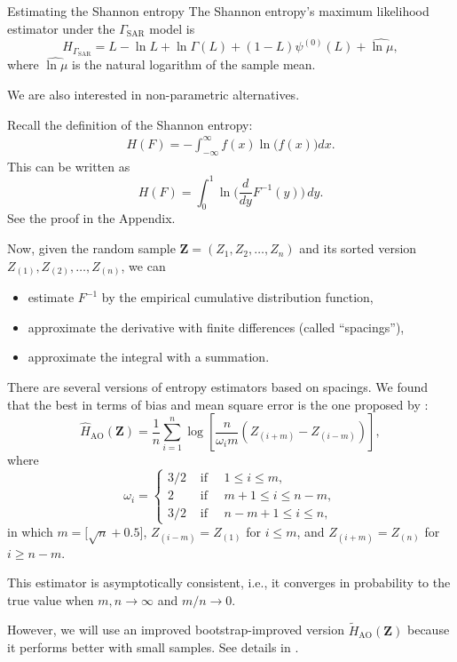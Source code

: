 \documentclass[table,aspectratio=169]{beamer}
\begin{document}
\begin{frame}[allowframebreaks]{Estimating the Shannon entropy}
The Shannon entropy's maximum likelihood estimator under the $\Gamma_{\text{SAR}}$ model is
$$
\widehat{H_{\Gamma_{\text{SAR}}}} = L -\ln L+\ln\Gamma(L)+(1-L)\psi^{(0)}(L) + \widehat{\ln \mu},
$$
where $\widehat{\ln \mu}$ is the natural logarithm of the sample mean.

We are also interested in non-parametric alternatives.

Recall the definition of the Shannon entropy:
\begin{align*}
	H(F) = -\int_{-\infty}^\infty f(x) \ln\big(f(x)\big) dx.
\end{align*}
This can be written as
$$
H(F) = \int_{0}^{1} \ln \Big( \frac{d}{dy} F^{-1}(y) \Big) \, dy.
$$
See the proof in the Appendix.

Now, given the random sample $\bm Z=(Z_1,Z_2,\dots,Z_n)$ and its sorted version $Z_{(1)},Z_{(2)},\dots,Z_{(n)}$, we can 
\begin{itemize}
	\item estimate $F^{-1}$ by the empirical cumulative distribution function,
	\item approximate the derivative with finite differences (called ``spacings''),
	\item approximate the integral with a summation.
\end{itemize}

There are several versions of entropy estimators based on spacings.
We found that the best in terms of bias and mean square error is the one proposed by
\citet{IbrahimAlOmari2014}:
 \[
	\widehat{H}_{\text{AO}}(\bm{Z})=\frac{1}{n} \sum_{i=1}^n \log \left[\frac{n}{\omega_i m}\left(Z_{(i+m)}-Z_{(i-m)}\right)\right],
	\] where \[
	\omega_i= \begin{cases}3/2 & \text { if }\quad 1 \leq i \leq m, \\ 2 & \text { if }\quad m+1 \leq i \leq n-m, \\ 3/2 & \text { if } \quad n-m+1 \leq i \leq n,\end{cases}
	\] 
	in which \(m=\big[\sqrt{n}+0.5\big]\), \(Z_{(i-m)}=Z_{(1)}\) for \(i \leq m\), and
	\(Z_{(i+m)}=Z_{(n)}\) for \(i \geq n-m\).

This estimator is asymptotically consistent, i.e., it converges in
probability to the true value when \(m,n\rightarrow\infty\) and
\(m/n\rightarrow0\). 

However, we will use an improved bootstrap-improved
version $\widetilde{H}_{\text{AO}}(\bm Z)$ because it performs better with small samples.
See details in \citet{IdentifyingHeterogeneityinSARDatawithNewTestStatistics}.
\end{frame}
\end{document}
